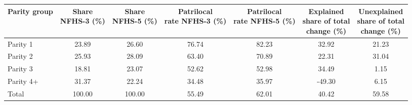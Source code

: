 \begin{tabular}{lcccccc}
\toprule
Parity group & \makecell{Share\\NFHS-3 (\%)} & \makecell{Share\\NFHS-5 (\%)} & \makecell{Patrilocal\\rate NFHS-3 (\%)} & \makecell{Patrilocal\\rate NFHS-5 (\%)} & \makecell{Explained\\share of total\\change (\%)} & \makecell{Unexplained\\share of total\\change (\%)} \\
\midrule
Parity 1&23.89&26.60&76.74&82.23&32.92&21.23\\
Parity 2&25.93&28.09&63.40&70.89&22.31&31.04\\
Parity 3&18.81&23.07&52.62&52.98&34.49&1.15\\
Parity 4+&31.37&22.24&34.48&35.97&-49.30&6.15\\
Total&100.00&100.00&55.49&62.01&40.42&59.58\\
\bottomrule
\end{tabular}
